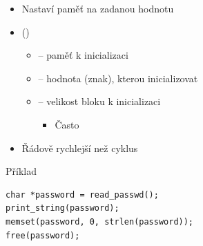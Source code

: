 \begin{frame}[fragile]{}

  \begin{itemize}
    \item Nastaví paměť na zadanou hodnotu

    \pause

    \item {} ()
    \begin{itemize}
      \item {} -- paměť k inicializaci
      \item {} -- hodnota (znak), kterou inicializovat
      \item {} -- velikost bloku k inicializaci
      \begin{itemize}
	\item Často 
      \end{itemize}
    \end{itemize}

    \pause

    \item Řádově rychlejší než  cyklus
  \end{itemize}

  \pause

  \begin{block}{Příklad}
    \begin{lstlisting}
char *password = read_passwd();
print_string(password);
memset(password, 0, strlen(password));
free(password);
    \end{lstlisting}
  \end{block}

\end{frame}

